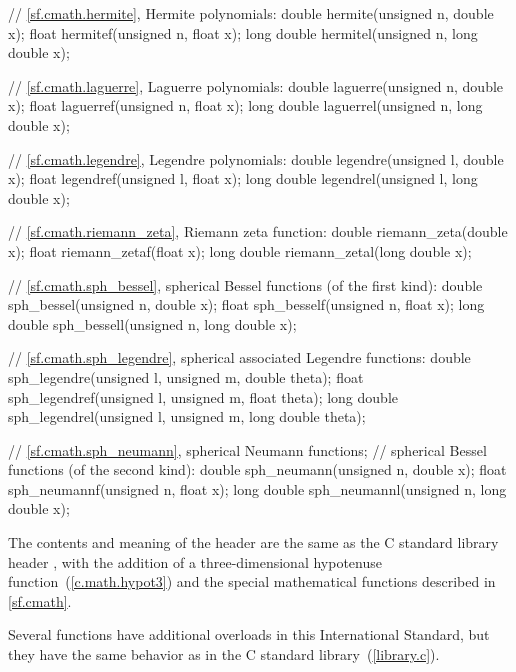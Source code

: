 \begin{codeblock}
{  // \ref{sf.cmath.hermite}, Hermite polynomials:
  double       hermite(unsigned n, double x);
  float        hermitef(unsigned n, float x);
  long double  hermitel(unsigned n, long double x);

  // \ref{sf.cmath.laguerre}, Laguerre polynomials:
  double       laguerre(unsigned n, double x);
  float        laguerref(unsigned n, float x);
  long double  laguerrel(unsigned n, long double x);

  // \ref{sf.cmath.legendre}, Legendre polynomials:
  double       legendre(unsigned l, double x);
  float        legendref(unsigned l, float x);
  long double  legendrel(unsigned l, long double x);

  // \ref{sf.cmath.riemann_zeta}, Riemann zeta function:
  double       riemann_zeta(double x);
  float        riemann_zetaf(float x);
  long double  riemann_zetal(long double x);

  // \ref{sf.cmath.sph_bessel}, spherical Bessel functions (of the first kind):
  double       sph_bessel(unsigned n, double x);
  float        sph_besself(unsigned n, float x);
  long double  sph_bessell(unsigned n, long double x);

  // \ref{sf.cmath.sph_legendre}, spherical associated Legendre functions:
  double       sph_legendre(unsigned l, unsigned m, double theta);
  float        sph_legendref(unsigned l, unsigned m, float theta);
  long double  sph_legendrel(unsigned l, unsigned m, long double theta);

  // \ref{sf.cmath.sph_neumann}, spherical Neumann functions;
  // spherical Bessel functions (of the second kind):
  double       sph_neumann(unsigned n, double x);
  float        sph_neumannf(unsigned n, float x);
  long double  sph_neumannl(unsigned n, long double x);
}
\end{codeblock}

\pnum
The contents and meaning of the header 
are the same as the C standard library header ,
with the addition of 
a three-dimensional hypotenuse function~(\ref{c.math.hypot3}) and
the special mathematical functions described in \ref{sf.cmath}.
\begin{note}
Several functions have additional overloads in this International Standard,
but they have the same behavior as in the C standard library~(\ref{library.c}).
\end{note}

